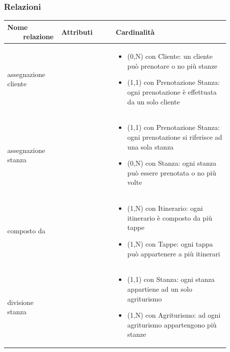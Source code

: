 \documentclass[12pt,a4paper]{article}
\begin{document}
\subsubsection{Relazioni}
\label{Soggiono Relazioni}
\begin{center}

\setlength{\extrarowheight}{1.5pt}

\begin{longtable}{|p{0.16\linewidth}|p{0.24\linewidth}|p{0.50\linewidth}|}
\hline 
\textbf{Nome \ \ \ \ relazione} 	& \textbf{Attributi} & \textbf{Cardinalità}\\ 

    
\hline
assegnazione cliente 				&  
					& \begin{itemize}
						\setlength{\itemindent}{-1em}
						\vspace{-15pt}
						\setlength\itemsep{-0.25em}
						\item (0,N) con Cliente: un cliente può prenotare o no più stanze
						\item (1,1) con Prenotazione Stanza: ogni prenotazione è effettuata da un solo cliente
					\end{itemize}\\ 

\hline
assegnazione stanza 				&   
					& \begin{itemize}
						\setlength{\itemindent}{-1em}
						\vspace{-25pt}
						\setlength\itemsep{-0.25em}
						\item (1,1) con Prenotazione Stanza: ogni prenotazione si riferisce ad una sola stanza
						\item (0,N) con Stanza: ogni stanza può essere prenotata o no più volte
					\end{itemize}\\ 

\hline
composto da 				&   
					& \begin{itemize}
						\setlength{\itemindent}{-1em}
						\vspace{-25pt}
						\setlength\itemsep{-0.25em}
						\item (1,N) con Itinerario: ogni itinerario è composto da più tappe
						\item (1,N) con Tappe: ogni tappa può appartenere a più itinerari
					\end{itemize}\\ 

\hline
divisione stanza 				&   
					& \begin{itemize}
						\setlength{\itemindent}{-1em}
						\vspace{-25pt}
						\setlength\itemsep{-0.25em}
						\item (1,1) con Stanza: ogni stanza appartiene ad un solo agriturismo
						\item (1,N) con Agriturismo: ad ogni agriturismo appartengono più stanze
					\end{itemize}\\ 


\end{longtable}
\end{center}
\end{document}
